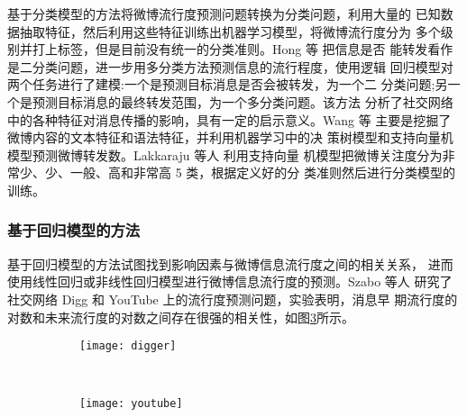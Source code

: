 基于分类模型的方法将微博流行度预测问题转换为分类问题，利用大量的 已知数据抽取特征，然后利用这些特征训练出机器学习模型，将微博流行度分为 多个级别并打上标签，但是目前没有统一的分类准则。Hong 等 \citep{hong2011predicting}把信息是否 能转发看作是二分类问题，进一步用多分类方法预测信息的流行程度，使用逻辑 回归模型对两个任务进行了建模:一个是预测目标消息是否会被转发，为一个二 分类问题;另一个是预测目标消息的最终转发范围，为一个多分类问题。该方法 分析了社交网络中的各种特征对消息传播的影响，具有一定的启示意义。Wang 等\citep{hong2011predicting} 主要是挖掘了微博内容的文本特征和语法特征，并利用机器学习中的决 策树模型和支持向量机模型预测微博转发数。Lakkaraju 等人 \citep{Lakkaraju2011Attention}利用支持向量 机模型把微博关注度分为非常少、少、一般、高和非常高 5 类，根据定义好的分 类准则然后进行分类模型的训练。

\subsubsection{基于回归模型的方法}

基于回归模型的方法试图找到影响因素与微博信息流行度之间的相关关系， 进而使用线性回归或非线性回归模型进行微博信息流行度的预测。Szabo 等人 \citep{szabo2010predicting} 研究了社交网络 Digg 和 YouTube 上的流行度预测问题，实验表明，消息早 期流行度的对数和未来流行度的对数之间存在很强的相关性，如图\ref{fig:digger-youtube}所示。
\begin{figure}[H]
    \centering
    \begin{subfigure}[b]{0.5\textwidth}
      \texttt{[image: digger]}
      \caption{}
      \label{}
    \end{subfigure}%
    ~%
    \begin{subfigure}[b]{0.5\textwidth}
      \texttt{[image: youtube]}
      \caption{}
      \label{}
    \end{subfigure}
    \label{fig:digger-youtube} 
\end{figure}


